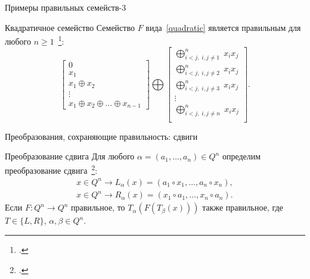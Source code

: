 \begin{frame}{Примеры правильных семейств-3}
    \begin{alertblock}{Квадратичное семейство}
        Семейство $F$ вида~\ref{quadratic} является правильным для любого $n \ge 1$~\footcite{dm21}:
        \begin{equation}
            \label{quadratic}
            \begin{bmatrix}
            0 \\
            x_1 \\
            x_1 \oplus x_2 \\
            \vdots \\
            x_1 \oplus x_2 \oplus \ldots \oplus x_{n-1}
            \end{bmatrix}
            \bigoplus
            \begin{bmatrix}
            \bigoplus_{i < j, \; i, j \ne 1}^n \; x_i x_j \\
            \bigoplus_{i < j, \; i, j \ne 2}^n \; x_i x_j \\
            \bigoplus_{i < j, \; i, j \ne 3}^n \; x_i x_j \\
            \vdots \\
            \bigoplus_{i < j, \; i, j \ne n}^n \; x_i x_j \\
            \end{bmatrix}.
        \end{equation}
    \end{alertblock}
\end{frame}


\begin{frame}{Преобразования, сохраняющие правильность: сдвиги}
    \begin{exampleblock}{Преобразование сдвига}
        \label{thm:shift}
        Для любого $\alpha = (a_1, \ldots, a_n) \in Q^n$ определим преобразование сдвига~\footcite{nosov08}:
        \begin{gather*}
            x \in Q^n \to L_{\alpha}(x) = (a_1 \circ x_1, \ldots, a_n \circ x_n), \\
            x \in Q^n \to R_{\alpha}(x) = (x_1 \circ a_1, \ldots, x_n \circ a_n).
        \end{gather*}
        \pause
        Если $F \colon Q^n \to Q^n$ правильное, то $T_{\alpha}(F(T_{\beta}(x)))$ также правильное, где $T \in \{L, R\}$, $\alpha, \beta \in Q^n$.
    \end{exampleblock}
\end{frame}


